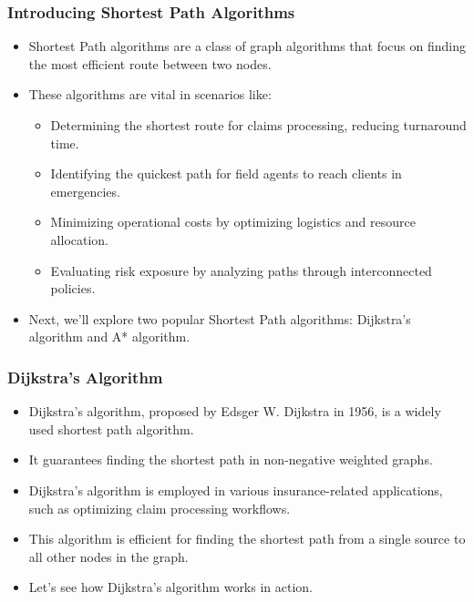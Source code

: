 \begin{frame}[fragile]\frametitle{Introducing Shortest Path Algorithms}
\begin{itemize}
\item Shortest Path algorithms are a class of graph algorithms that focus on finding the most efficient route between two nodes.
\item These algorithms are vital in scenarios like:
\begin{itemize}
\item Determining the shortest route for claims processing, reducing turnaround time.
\item Identifying the quickest path for field agents to reach clients in emergencies.
\item Minimizing operational costs by optimizing logistics and resource allocation.
\item Evaluating risk exposure by analyzing paths through interconnected policies.
\end{itemize}
\item Next, we'll explore two popular Shortest Path algorithms: Dijkstra's algorithm and A* algorithm.
\end{itemize}
\end{frame}

\begin{frame}[fragile]\frametitle{Dijkstra's Algorithm}
\begin{itemize}
\item Dijkstra's algorithm, proposed by Edsger W. Dijkstra in 1956, is a widely used shortest path algorithm.
\item It guarantees finding the shortest path in non-negative weighted graphs.
\item Dijkstra's algorithm is employed in various insurance-related applications, such as optimizing claim processing workflows.
\item This algorithm is efficient for finding the shortest path from a single source to all other nodes in the graph.
\item Let's see how Dijkstra's algorithm works in action.
\end{itemize}
\end{frame}

